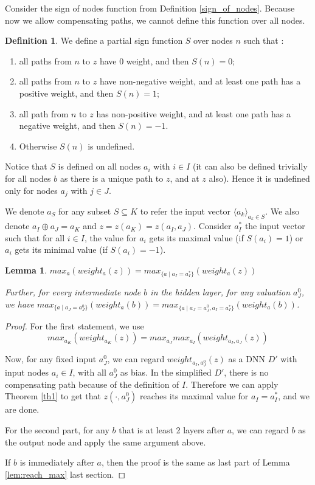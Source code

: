 \documentclass[]{article}
\newtheorem{lemma}{Lemma}
\theoremstyle{definition}
\newtheorem{definition}{Definition}
\begin{document}
Consider the sign of nodes function from Definition \ref{sign_of_nodes}. Because now we allow compensating paths, we cannot define this function over all nodes.


\begin{definition}\label{sign_of_nodes_in_I_2}
	We define a partial sign function $S$ over nodes $n$ such that : 	
	\begin{enumerate} 
		\item all paths from $n$ to $z$ have 0 weight, and then $S(n)=0$; 
		\item all paths from $n$ to $z$ have non-negative weight, and at least one path has a positive weight, and then $S(n)=1$; 
		\item all path from $n$ to $z$ has non-positive weight, and at least one path has a negative weight, and then $S(n)=-1$.
		\item Otherwise $S(n)$ is undefined.
	\end{enumerate}
\end{definition}	

Notice that $S$ is defined on all nodes $a_i$ with $i \in I$ (it can also be defined trivially for all nodes $b$ as there is a unique path to $z$, and at $z$ also). Hence it is undefined only for nodes $a_j$ with $j \in J$.




We denote $a_S$ for any subset $S\subseteq K$ to refer the input vector $\langle a_k\rangle_{a_k\in S}$. We also denote $a_I\oplus a_J = a_K$ and $z=z(a_K)=z(a_I,a_J)$.
Consider $a_I^*$ the input vector such that for all $i \in I$, the value for $a_i$ gets its maximal value (if $S(a_i)=1$) or $a_i$ gets its minimal value (if $S(a_i)=-1$).

\begin{lemma} \label{lem:reach_max_2}
	$max_a (weight_{a}(z)) = max_{\{a \mid a_I=a^*_I\}} (weight_{a}(z))$
	
	Further, for every intermediate node $b$ in the hidden layer, for any valuation $a^0_J$, 
	we have $max_{\{a \mid a_J=a^0_J\}} (weight_{a}(b)) = max_{\{a \mid a_J=a^0_J,a_I=a_I^*\}} (weight_{a}(b))$.	
\end{lemma}

\begin{proof}
	For the first statement, we use 
	$$max_{a_K} (weight_{a_K}(z)) = max_{a_J} max_{a_I} (weight_{a_I,a_J}(z))$$
	
	Now, for any fixed input $a^0_J$, we can regard $weight_{a_I,a^0_J}(z)$ as a DNN $D'$ with input nodes $a_i\in I$, with all $a^0_J$ %
	as bias. In the simplified $D'$, there is no compensating path because of the definition of $I$. Therefore we can apply Theorem \ref{th1} to get that $z(\cdot,a^0_J)$ reaches its maximal value for $a_I=a_I^*$, and we are done.
	
	For the second part, for any $b$ that is at least 2 layers after $a$, we can regard $b$ as the output node and apply the same argument above.
	
	If $b$ is immediately after $a$, then the proof is the same as last part of Lemma \ref{lem:reach_max} last section.
	

\end{proof}
\end{document}
